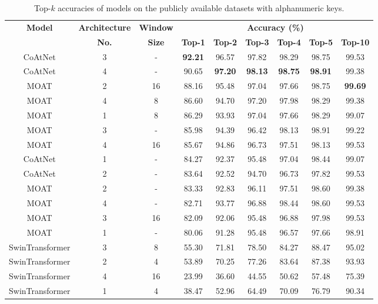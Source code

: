 \documentclass[a4paper,11pt,twoside]{report}
\theoremstyle{definition}
\begin{document}
\begin{table}[ht]
\centering
\caption{Top-$k$ accuracies of models on the publicly available datasets with alphanumeric keys.}
\begin{adjustbox}{max width=\textwidth}
\begin{tabular}{c|c|c|cccccc}
\hline
\textbf{Model} & \textbf{Architecture} & \textbf{Window} & \multicolumn{6}{c}{\textbf{Accuracy (\%)}} \\
\cline{4-9}
 & \textbf{No.} & \textbf{Size} & \textbf{Top-1} & \textbf{Top-2} & \textbf{Top-3} & \textbf{Top-4} & \textbf{Top-5} & \textbf{Top-10} \\
\hline
CoAtNet & 3 & - & \textbf{92.21} & 96.57 & 97.82 & 98.29 & 98.75 & 99.53 \\
CoAtNet & 4 & - & 90.65 & \textbf{97.20} & \textbf{98.13} & \textbf{98.75} & \textbf{98.91} & 99.38 \\
MOAT & 2 & 16 & 88.16 & 95.48 & 97.04 & 97.66 & 98.75 & \textbf{99.69} \\
MOAT & 4 & 8 & 86.60 & 94.70 & 97.20 & 97.98 & 98.29 & 99.38 \\
MOAT & 1 & 8 & 86.29 & 93.93 & 97.04 & 97.66 & 98.29 & 99.07 \\
MOAT & 3 & - & 85.98 & 94.39 & 96.42 & 98.13 & 98.91 & 99.22 \\
MOAT & 4 & 16 & 85.67 & 94.86 & 96.73 & 97.51 & 98.13 & 99.53 \\
CoAtNet & 1 & - & 84.27 & 92.37 & 95.48 & 97.04 & 98.44 & 99.07 \\
CoAtNet & 2 & - & 83.64 & 92.52 & 94.70 & 96.73 & 97.82 & 99.53 \\
MOAT & 2 & - & 83.33 & 92.83 & 96.11 & 97.51 & 98.60 & 99.38 \\
MOAT & 4 & - & 82.71 & 93.77 & 96.88 & 98.44 & 98.60 & 99.53 \\
MOAT & 3 & 16 & 82.09 & 92.06 & 95.48 & 96.88 & 97.98 & 99.53 \\
MOAT & 1 & - & 80.06 & 91.28 & 95.48 & 96.57 & 97.66 & 98.91 \\
SwinTransformer & 3 & 8 & 55.30 & 71.81 & 78.50 & 84.27 & 88.47 & 95.02 \\
SwinTransformer & 2 & 4 & 53.89 & 70.25 & 77.26 & 83.64 & 87.38 & 93.93 \\
SwinTransformer & 4 & 16 & 23.99 & 36.60 & 44.55 & 50.62 & 57.48 & 75.39 \\
SwinTransformer & 1 & 4 & 38.47 & 52.96 & 64.49 & 70.09 & 76.79 & 90.34 \\
\hline
\end{tabular}
\end{adjustbox}
\end{table}
\end{document}
